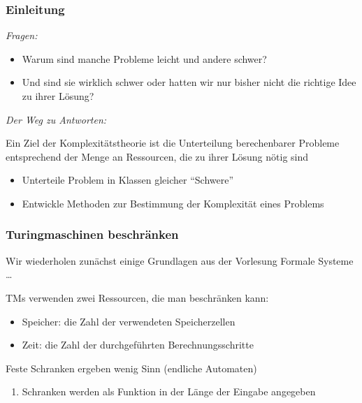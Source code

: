 \documentclass[aspectratio=1610,onlymath]{beamer}
\begin{document}
\begin{frame}\frametitle{Einleitung}

\emph{Fragen:}
\begin{itemize}
\item Warum sind manche Probleme leicht und andere schwer?
\item Und sind sie wirklich schwer oder hatten wir nur bisher nicht die richtige Idee zu ihrer Lösung?
\end{itemize}\bigskip

\emph{Der Weg zu Antworten:}\smallskip

Ein Ziel der \alert{Komplexitätstheorie} ist die Unterteilung berechenbarer Probleme
entsprechend der Menge an Ressourcen, die zu ihrer Lösung nötig sind
\begin{itemize}
\item Unterteile Problem in Klassen gleicher "`Schwere"'
\item Entwickle Methoden zur Bestimmung der Komplexität eines Problems
\end{itemize}

\end{frame}


\begin{frame}\frametitle{Turingmaschinen beschränken}

Wir wiederholen zunächst einige Grundlagen aus der Vorlesung Formale Systeme \ldots
\bigskip

TMs verwenden zwei Ressourcen, die man beschränken kann:
\begin{itemize}
\item \alert{Speicher:} die Zahl der verwendeten Speicherzellen
\item \alert{Zeit:} die Zahl der durchgeführten Berechnungsschritte
\end{itemize}\pause
Feste Schranken ergeben wenig Sinn (endliche Automaten)\\
\begin{enumerate}[$\leadsto$]
\item Schranken werden als Funktion in der Länge der Eingabe angegeben
\end{enumerate}
\bigskip


\end{frame}
\end{document}
